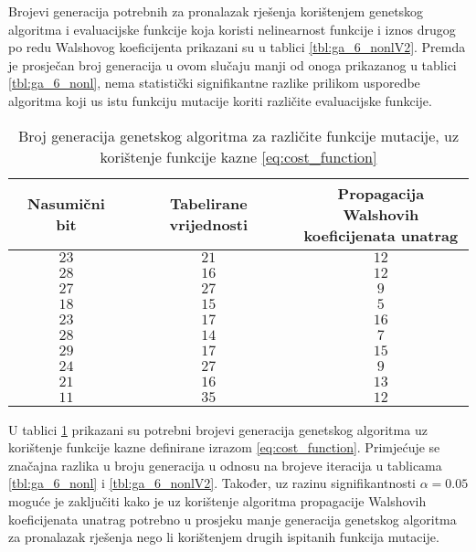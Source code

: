 Brojevi generacija potrebnih za pronalazak rješenja korištenjem genetskog algoritma i evaluacijske funkcije koja koristi nelinearnost funkcije i iznos drugog po redu Walshovog koeficijenta prikazani su u tablici \ref{tbl:ga_6_nonlV2}.
Premda je prosječan broj generacija u ovom slučaju manji od onoga prikazanog u tablici \ref{tbl:ga_6_nonl}, nema statistički signifikantne razlike prilikom usporedbe algoritma koji us istu funkciju mutacije koriti različite evaluacijske funkcije.

\begin{table}[]
    \centering
    \begin{tabular}{ccc}
        Nasumični bit & Tabelirane vrijednosti & \makecell{Propagacija Walshovih \\ koeficijenata unatrag} \\ \hline
        $23$ & $21$ & $12$ \\
        $28$ & $16$ & $12$ \\
        $27$ & $27$ &  $9$ \\
        $18$ & $15$ &  $5$ \\
        $23$ & $17$ & $16$ \\
        $28$ & $14$ &  $7$ \\
        $29$ & $17$ & $15$ \\
        $24$ & $27$ &  $9$ \\
        $21$ & $16$ & $13$ \\
        $11$ & $35$ & $12$
    \end{tabular}
    \captionsetup{justification=centering}
    \caption{Broj generacija genetskog algoritma za različite funkcije mutacije, uz korištenje funkcije kazne \eqref{eq:cost_function}}
    \label{tbl:ga_6_walshe}
\end{table}

U tablici \ref{tbl:ga_6_walshe} prikazani su potrebni brojevi generacija genetskog algoritma uz korištenje funkcije kazne definirane izrazom \eqref{eq:cost_function}.
Primjećuje se značajna razlika u broju generacija u odnosu na brojeve iteracija u tablicama \ref{tbl:ga_6_nonl} i \ref{tbl:ga_6_nonlV2}.
Također, uz razinu signifikantnosti $\alpha = 0.05$ moguće je zaključiti kako je uz korištenje algoritma propagacije Walshovih koeficijenata unatrag potrebno u prosjeku manje generacija genetskog algoritma za pronalazak rješenja nego li korištenjem drugih ispitanih funkcija mutacije.

